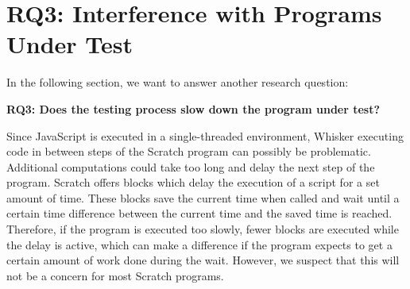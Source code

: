 %
%

\section{RQ3: Interference with Programs Under Test}
\label{sec:rq3}

In the following section, we want to answer another research question:

\begin{center}\begin{minipage}{.9\textwidth}
    \textbf{RQ3: Does the testing process slow down the program under test?}
\end{minipage}\end{center}

\noindent Since JavaScript is executed in a single-threaded environment,
Whisker executing code in between steps of the Scratch program can possibly be problematic.
Additional computations could take too long and delay the next step of the program.
Scratch offers blocks which delay the execution of a script for a set amount of time.
These blocks save the current time when called and wait until a certain time difference between the current time and the saved time is reached.
Therefore, if the program is executed too slowly, fewer blocks are executed while the delay is active,
which can make a difference if the program expects to get a certain amount of work done during the wait.
However, we suspect that this will not be a concern for most Scratch programs.
\parspace

